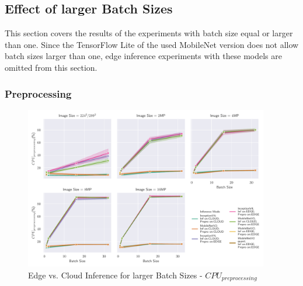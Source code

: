 \subsection{Effect of larger Batch Sizes}
\label{chap:resultsBatchSize}
This section covers the results of the experiments with batch size equal or larger than one. Since the TensorFlow Lite of the used MobileNet version does not allow batch sizes larger than one, edge inference experiments with these models are omitted from this section.
\subsubsection{Preprocessing}
\begin{figure}[H]
\centering
\includegraphics[width=0.95\textwidth]{./Bilder/single_plots/batch_size_plots/Effects_of_Batch_size_Preprocessing_CPU_Usage.pdf}
\caption{Edge vs. Cloud Inference for larger Batch Sizes -  $CPU_{preprocessing}$}
\label{fig:BatchSizePreproCPU}
\end{figure}


